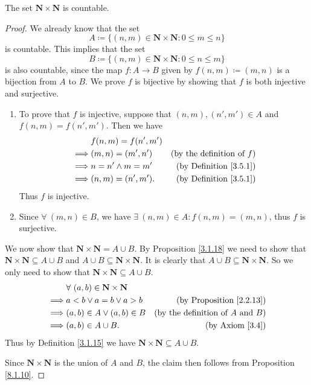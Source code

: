 \begin{corollary}\label{8.1.13}
    The set \(\mathbf{N} \times \mathbf{N}\) is countable.
\end{corollary}

\begin{proof}
    We already know that the set
    \[
        A \coloneqq \{(n, m) \in \mathbf{N} \times \mathbf{N} : 0 \leq m \leq n\}
    \]
    is countable.
    This implies that the set
    \[
        B \coloneqq \{(n, m) \in \mathbf{N} \times \mathbf{N} : 0 \leq n \leq m\}
    \]
    is also countable, since the map \(f : A \to B\) given by \(f(n, m) \coloneqq (m, n)\) is a bijection from \(A\) to \(B\).
    We prove \(f\) is bijective by showing that \(f\) is both injective and surjective.
    \begin{enumerate}
        \item To prove that \(f\) is injective, suppose that \((n, m), (n', m') \in A\) and \(f(n, m) = f(n', m')\).
              Then we have
              \begin{align*}
                           & f(n, m) = f(n', m')                                       \\
                  \implies & (m, n) = (m', n')   & \text{(by the definition of \(f\))} \\
                  \implies & n = n' \land m = m' & \text{(by Definition \ref{3.5.1})}  \\
                  \implies & (n, m) = (n', m').  & \text{(by Definition \ref{3.5.1})}
              \end{align*}
              Thus \(f\) is injective.
        \item Since \(\forall\ (m, n) \in B\), we have \(\exists\ (n, m) \in A : f(n, m) = (m, n)\), thus \(f\) is surjective.
    \end{enumerate}

    We now show that \(\mathbf{N} \times \mathbf{N} = A \cup B\).
    By Proposition \ref{3.1.18} we need to show that \(\mathbf{N} \times \mathbf{N} \subseteq A \cup B\) and \(A \cup B \subseteq \mathbf{N} \times \mathbf{N}\).
    It is clearly that \(A \cup B \subseteq \mathbf{N} \times \mathbf{N}\).
    So we only need to show that \(\mathbf{N} \times \mathbf{N} \subseteq A \cup B\).
    \begin{align*}
                 & \forall\ (a, b) \in \mathbf{N} \times \mathbf{N}                                                 \\
        \implies & a < b \lor a = b \lor a > b                      & \text{(by Proposition \ref{2.2.13})}          \\
        \implies & (a, b) \in A \lor (a, b) \in B                   & \text{(by the definition of \(A\) and \(B\))} \\
        \implies & (a, b) \in A \cup B.                             & \text{(by Axiom \ref{3.4})}
    \end{align*}
    Thus by Definition \ref{3.1.15} we have \(\mathbf{N} \times \mathbf{N} \subseteq A \cup B\).

    Since \(\mathbf{N} \times \mathbf{N}\) is the union of \(A\) and \(B\), the claim then follows from Proposition \ref{8.1.10}.
\end{proof}

